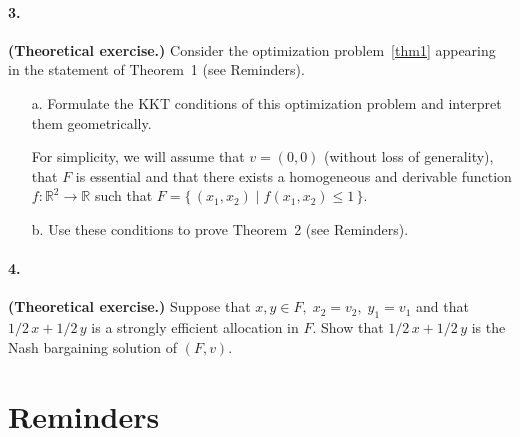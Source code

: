 \documentclass{../ape}
\begin{document}
\paragraph{3. } \textbf{(Theoretical exercise.)} Consider the optimization problem~\eqref{thm1} appearing in the statement of Theorem~1 (see Reminders).
\begin{enumerate}
	\item[a.] Formulate the KKT conditions of this optimization problem and interpret them geometrically.
	
	For simplicity, we will assume that $v = (0, 0)$ (without loss of generality), that $F$ is essential and that there exists a homogeneous and derivable function $f : \mathbb{R}^2 \rightarrow \mathbb{R}$ such that $F = \{ \, (x_1, x_2) \; | \; f(x_1, x_2) \leq 1 \, \}$.
	\item[b.] Use these conditions to prove Theorem~2 (see Reminders).
\end{enumerate}

	
\paragraph{4. } \textbf{(Theoretical exercise.)} Suppose that $x, y \in F, \; x_2 = v_2, \; y_1 = v_1$ and that $1/2 \, x + 1/2 \, y$ is a strongly efficient allocation in $F$. Show that $1/2 \, x + 1/2 \, y$ is the Nash bargaining solution of $(F,v)$.
	
\newpage

\section*{Reminders}
\end{document}
